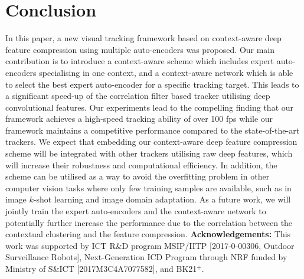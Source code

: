 \documentclass[10pt,twocolumn,letterpaper]{article}
\begin{document}
\section{Conclusion}
\vspace{-3mm}
In this paper, a new visual tracking framework based on context-aware deep feature compression using multiple auto-encoders was proposed. 
Our main contribution is to introduce a context-aware scheme which includes expert auto-encoders specialising in one context, and a context-aware network which is able to select the best expert auto-encoder for a specific tracking target.
This leads to a significant speed-up of the correlation filter based tracker utilising deep convolutional features. Our experiments lead to the compelling finding that our framework achieves a high-speed tracking ability of over 100 fps while our framework maintains a competitive performance compared to the state-of-the-art trackers. We expect that embedding our context-aware deep feature compression scheme will be integrated with other trackers utilising raw deep features, which will increase their robustness and computational efficiency.
In addition, the scheme can be utilised as a way to avoid the overfitting problem in other computer vision tasks where only few training samples are available, such as in image $k$-shot learning and image domain adaptation.
As a future work, we will jointly train the expert auto-encoders and the context-aware network to potentially further increase the performance due to the correlation between the contextual clustering and the feature compression. 
\vspace{1mm}
\footnotesize
\noindent\textbf{Acknowledgements:} 
This work was supported by  ICT R\&D program MSIP/IITP [2017-0-00306, Outdoor Surveillance Robots], Next-Generation ICD Program through NRF funded by Ministry of S\&ICT [2017M3C4A7077582], 
and BK21$^+$.
\normalsize


{\small


}
\end{document}
